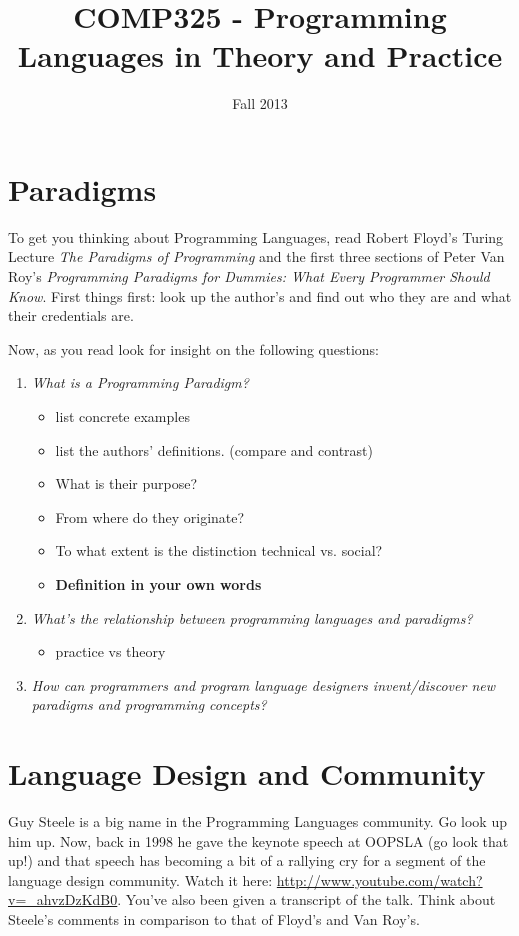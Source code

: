 \documentclass[10pt]{article}
\title{COMP325 - Programming Languages in Theory and Practice}
\author{  }
\date{Fall 2013}
\begin{document}
\maketitle

\section{Paradigms}

To get you thinking about Programming Languages, read Robert Floyd's Turing Lecture \textit{The Paradigms of Programming} and the first three sections of Peter Van Roy's \textit{Programming Paradigms for Dummies: What Every Programmer Should Know}.  First things first: look up the author's and find out who they are and what their credentials are.  

Now, as you read look for insight on the following questions:
\begin{enumerate}
\item \textit{What is a Programming Paradigm?}
\begin{itemize}
\item list concrete examples
\item list the authors' definitions. (compare and contrast)
\item What is their purpose? 
\item From where do they originate? 
\item To what extent is the distinction technical vs. social?
\item \textbf{Definition in your own words}
\end{itemize}
\item \textit{What's the relationship between programming languages and paradigms?}
\begin{itemize}
\item practice vs theory
\end{itemize}
\item \textit{How can programmers and program language designers invent/discover new paradigms and programming concepts?}
\end{enumerate}

\section{Language Design and Community}

Guy Steele is a big name in the Programming Languages community.  Go look up him up.  Now, back in 1998 he gave the keynote speech at OOPSLA (go look that up!) and that speech has becoming a bit of a rallying cry for a segment of the language design community.  Watch it here: \url{http://www.youtube.com/watch?v=_ahvzDzKdB0}. You've also been given a transcript of the talk. Think about Steele's comments in comparison to that of Floyd's and Van Roy's.
\end{document}
